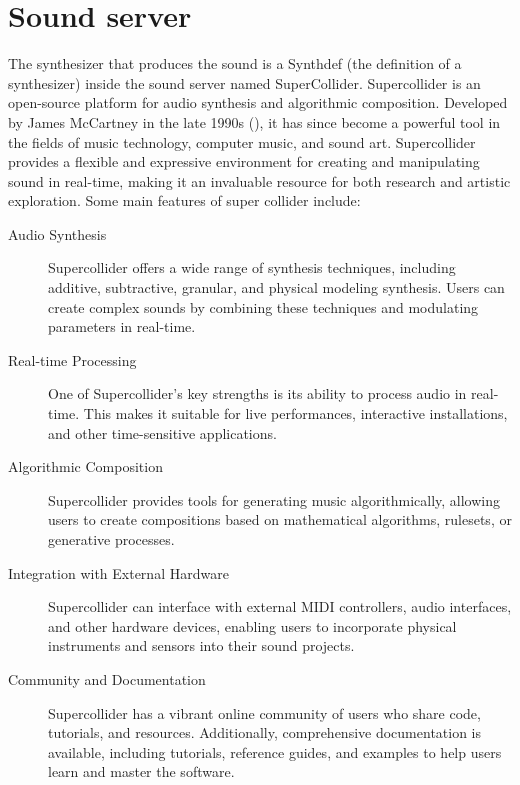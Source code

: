 \documentclass[a4paper]{book}
\begin{document}
\section{Sound server}
The synthesizer that produces the sound is a Synthdef (the definition of a synthesizer) inside the sound server named SuperCollider. Supercollider is an open-source platform for audio synthesis and algorithmic composition. Developed by James McCartney in the late 1990s (\cite{scBook}), it has since become a powerful tool in the fields of music technology, computer music, and sound art. Supercollider provides a flexible and expressive environment for creating and manipulating sound in real-time, making it an invaluable resource for both research and artistic exploration. Some main features of super collider include:

\begin{description}
	\item[Audio Synthesis] Supercollider offers a wide range of synthesis techniques, including additive, subtractive, granular, and physical modeling synthesis. Users can create complex sounds by combining these techniques and modulating parameters in real-time.
	\item[Real-time Processing] One of Supercollider's key strengths is its ability to process audio in real-time. This makes it suitable for live performances, interactive installations, and other time-sensitive applications.
	\item[Algorithmic Composition] Supercollider provides tools for generating music algorithmically, allowing users to create compositions based on mathematical algorithms, rulesets, or generative processes.
	\item[Integration with External Hardware] Supercollider can interface with external MIDI controllers, audio interfaces, and other hardware devices, enabling users to incorporate physical instruments and sensors into their sound projects.
	\item[Community and Documentation] Supercollider has a vibrant online community of users who share code, tutorials, and resources. Additionally, comprehensive documentation is available, including tutorials, reference guides, and examples to help users learn and master the software.
	
	
\end{description}
\end{document}
